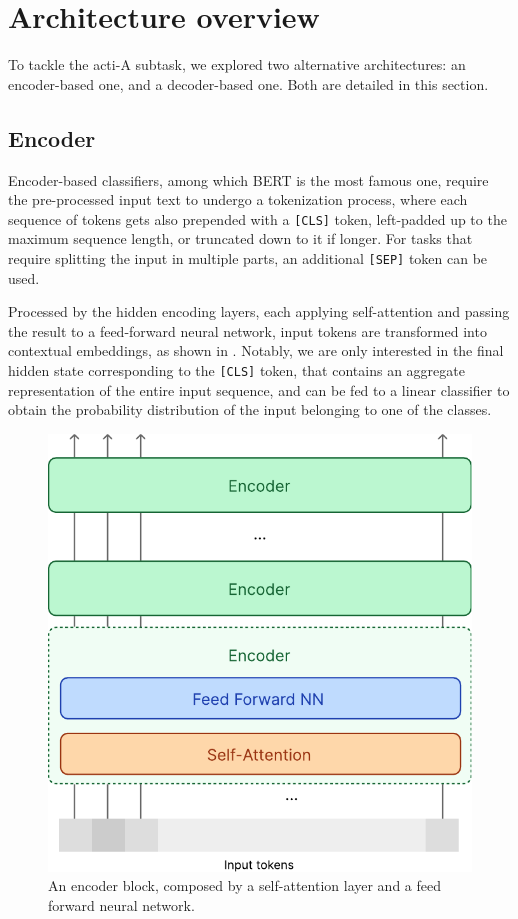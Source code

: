 \documentclass[11pt]{article}
\begin{document}
\section{Architecture overview}\label{sec:architecture-overview}
To tackle the \ac{acti}-A subtask, we explored two alternative architectures: an encoder-based one, and
a decoder-based one. Both are detailed in this section.

\subsection{Encoder}
Encoder-based classifiers, among which BERT \cite{devlin-etal-2019-bert} is the most famous one, require the
pre-processed input text to undergo a tokenization process, where each sequence of tokens gets also prepended
with a \texttt{[CLS]} token, left-padded up to the maximum sequence length, or truncated down to it if longer.
For tasks that require splitting the input in multiple parts, an additional \texttt{[SEP]} token can be used.

Processed by the hidden encoding layers, each applying self-attention and passing the result to a feed-forward
neural network, input tokens are transformed into contextual embeddings, as shown in . Notably, we are only interested in
the final hidden state corresponding to the \texttt{[CLS]} token, that contains an aggregate representation of
the entire input sequence, and can be fed to a linear classifier to obtain the probability distribution of the
input belonging to one of the classes.

\begin{figure}
  \centering
  \includegraphics[width=0.8\linewidth]{figures/encoder-block.pdf}
  \caption{
    An encoder block, composed by a self-attention layer and a feed forward neural network.
  }
  \label{fig:encoder-block}
\end{figure}
\end{document}
